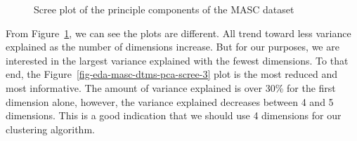 \documentclass[
  letterpaper,
  DIV=11,
  numbers=noendperiod]{scrreport}
\theoremstyle{definition}
\theoremstyle{remark}
\begin{document}
\begin{figure}

\begin{minipage}[t]{0.33\linewidth}

{\centering 


}

\end{minipage}%
%
\begin{minipage}[t]{0.33\linewidth}

{\centering 


}

\end{minipage}%
%
\begin{minipage}[t]{0.33\linewidth}

{\centering 


}

\end{minipage}%

\caption{\label{fig-eda-masc-dtms-pca-scree}Scree plot of the principle
components of the MASC dataset}

\end{figure}

From Figure~\ref{fig-eda-masc-dtms-pca-scree}, we can see the plots are
different. All trend toward less variance explained as the number of
dimensions increase. But for our purposes, we are interested in the
largest variance explained with the fewest dimensions. To that end, the
Figure~\ref{fig-eda-masc-dtms-pca-scree-3} plot is the most reduced and
most informative. The amount of variance explained is over 30\% for the
first dimension alone, however, the variance explained decreases between
4 and 5 dimensions. This is a good indication that we should use 4
dimensions for our clustering algorithm.
\end{document}
